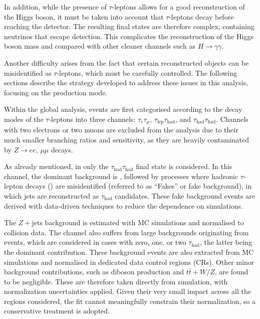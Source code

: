 In addition, while the presence of $\tau$-leptons allows for a good reconstruction of the Higgs boson, it must be taken into account that $\tau$-leptons decay before reaching the detector. The resulting final states are therefore complex, containing neutrinos that escape detection. This complicates the reconstruction of the Higgs boson mass and \pt compared with other cleaner channels such as $H \to \gamma\gamma$.  

Another difficulty arises from the fact that certain reconstructed objects can be misidentified as $\tau$-leptons, which must be carefully controlled. The following sections describe the strategy developed to address these issues in this analysis, focusing on the \ttH production mode. 

Within the global \htautau analysis, events are first categorised according to the decay modes of the $\tau$-leptons into three channels: $\tau_{e}\tau_{\mu}$, $\tau_{\text{lep}}\tau_{\text{had}}$, and $\tau_{\text{had}}\tau_{\text{had}}$. Channels with two electrons or two muons are excluded from the analysis due to their much smaller branching ratios and sensitivity, as they are heavily contaminated by $Z \to ee$, $\mu \mu$  decays.  

As already mentioned, in \ttHtt only the $\tau_{\text{had}}\tau_{\text{had}}$ final state is considered. In this channel, the dominant background is \ztautau, followed by processes where hadronic $\tau$-lepton decays (\tauhad) are misidentified (referred to as ``Fakes'' or fake background), in which jets are reconstructed as $\tau_{\text{had}}$ candidates.  These fake background events are derived with data-driven techniques to reduce the dependence on simulations.

The $Z+$jets background is estimated with MC simulations and normalised to collision data. The \ttH channel also suffers from large backgrounds originating from \ttbar events, which are considered in cases with zero, one, or two $\tau_{\text{had}}$, the latter being the dominant contribution. These \ttbar background events are also extracted from MC simulations and normalised in dedicated data control regions (CRs). 
Other minor background contributions, such as diboson production and $t\bar{t}+W/Z$, are found to be negligible.  
These are therefore taken directly from simulation, with normalization uncertainties applied.  
Given their very small impact across all the regions considered, the fit cannot meaningfully constrain their normalization, so a conservative treatment is adopted. 

